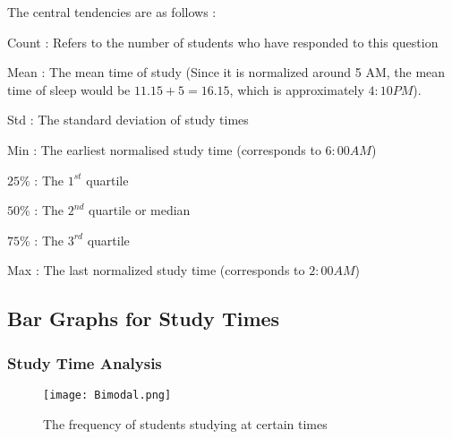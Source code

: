 \documentclass[11pt,]{beamer}
\begin{document}
\begin{frame}

    The central tendencies are as follows : 
    
    \begin{block}
    
    Count : Refers to the number of students who have responded to this question
    
    \smallskip
    
    Mean : The mean time of study (Since it is normalized around 5 AM, the mean time of sleep would be $11.15 + 5 = 16.15$, which is approximately $4:10 PM$).
    
    \smallskip
    
    Std : The standard deviation of study times 
    
    \smallskip
    
    Min : The earliest normalised study time (corresponds to $6:00 AM$)
    
    \smallskip
    
    $25\%$ : The $1^{st}$ quartile
    
    \smallskip
    
    $50\%$ : The $2^{nd}$ quartile or median
    
    \smallskip
    
    $75\%$ : The $3^{rd}$ quartile 
    
    \smallskip
    
    Max : The last normalized study time (corresponds to $2:00 AM$) 
    
    \end{block}

\end{frame}

\subsection{Bar Graphs for Study Times}

\begin{frame}

    \frametitle{Study Time Analysis}
    
	\begin{figure}
		\texttt{[image: Bimodal.png]}
		\caption{The frequency of students studying at certain times}
	\end{figure}
	
\end{frame}
\end{document}
